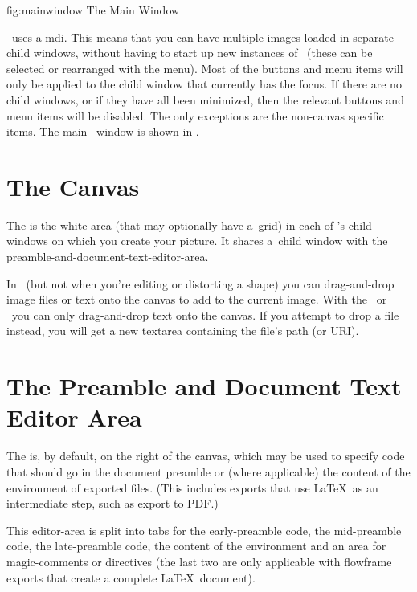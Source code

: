 \FloatFig
  {fig:mainwindow}
  {}
  {The Main Window}

\FlowframTk\ uses a \gls{mdi}. This means that you can have multiple
images loaded in separate child windows, without having to start up
new instances of \FlowframTk\ (these can be selected or rearranged
with the  menu). Most of the buttons and menu items
will only be applied to the child window that currently has the
focus. If there are no child windows, or if they have all been
minimized, then the relevant buttons and menu items will be disabled.
The only exceptions are the non-\gls{canvas} specific items.
The main \FlowframTk\ window is shown in .

\section{The Canvas}\label{sec:thecanvas}

The  is the white area (that may optionally
have a~\gls{grid}) in each of \FlowframTk's child windows on which you create
your picture. It shares a~child window with the
\gls{preamble-and-document-text-editor-area}.

In \selectmode\ (but not when you're editing or
distorting a shape) you can \gls{drag-and-drop} image files or
text onto the canvas to add to the current image. With the
\texttool\ or \mathstool\ you can only \gls{drag-and-drop} text onto
the canvas. If you attempt to drop a file instead, you will get a
new \gls{textarea} containing the file's path (or URI). 

\section{The Preamble and Document Text Editor Area}\label{sec:thepreamblepane}

The  is, by default, on the
right of the \gls{canvas}, which may be used to specify code that
should go in the document preamble or (where applicable) the
content of the  environment of exported files.  (This includes
exports that use \LaTeX\ as an intermediate step, such as export to PDF.)

This \gls{editor-area} is split into tabs for the \gls{early-preamble} code,
the \gls{mid-preamble} code, the \gls{late-preamble} code,
the content of the  environment and an area for
\glspl{magic-comment} or \glspl{directive} (the last two are
only applicable with \gls{flowframe} exports that create a complete
\LaTeX\ document).

